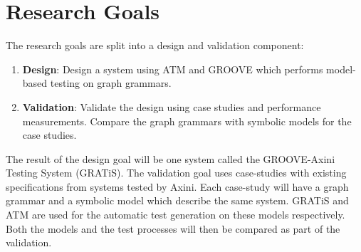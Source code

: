 \section{Research Goals}\label{sec:goals}

The research goals are split into a design and validation component:
\begin{enumerate}
    \item \textbf{Design}: Design a system using ATM and GROOVE which performs model-based testing on graph grammars.
    \item \textbf{Validation}: Validate the design using case studies and performance measurements. Compare the graph grammars with symbolic models for the case studies.
\end{enumerate}

The result of the design goal will be one system called the GROOVE-Axini Testing System (GRATiS). The validation goal uses case-studies with existing specifications from systems tested by Axini. Each case-study will have a graph grammar and a symbolic model which describe the same system. GRATiS and ATM are used for the automatic test generation on these models respectively. Both the models and the test processes will then be compared as part of the validation.
